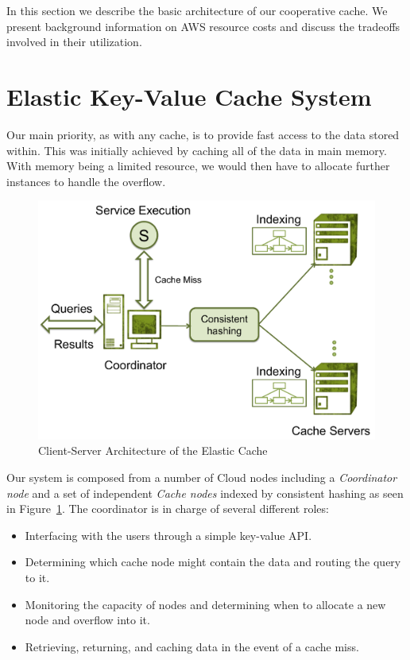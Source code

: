 In this section we describe the basic architecture of our cooperative cache. We
present background information on AWS resource costs and discuss the tradeoffs
involved in their utilization.

\section{Elastic Key-Value Cache System} %
\label{sec:Elastic_Key-Value_Cache_System}
Our main priority, as with any cache, is to provide fast access to the data
stored within. This was initially achieved by caching all of the data in main
memory. With memory being a limited resource, we would then have to allocate
further instances to handle the overflow.

\begin{figure}
\begin{center}
\includegraphics[scale=0.5]{figures/arch.pdf}
\end{center}
\caption{Client-Server Architecture of the Elastic Cache}
\label{fig:architecture}
\end{figure}

Our system is composed from a number of Cloud nodes including a
\emph{Coordinator node} and a set of independent \emph{Cache nodes} indexed by
consistent hashing as seen in Figure~\ref{fig:architecture}. The coordinator is
in charge of several different roles:
\begin{itemize}
	\item Interfacing with the users through a simple key-value API.
	\item Determining which cache node might contain the data and routing the
		query to it.
	\item Monitoring the capacity of nodes and determining when to allocate a new
		node and overflow into it.
	\item Retrieving, returning, and caching data in the event of a cache miss.
\end{itemize}

